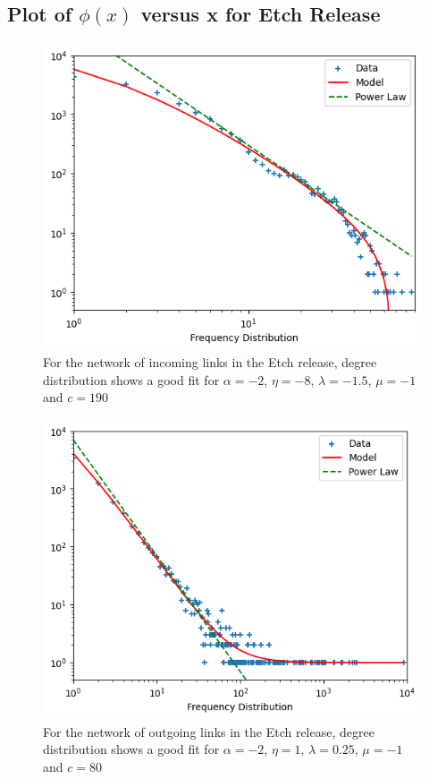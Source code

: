\documentclass[aps,twocolumn,10pt,reprint]{revtex4}
\begin{document}
\subsection{Plot of $\phi(x)$ versus x for Etch Release }
    
    \begin{figure}[H]
        \centering
        \includegraphics[width=1.0\linewidth, center]{images/lab5_q2_1.png}
        \vspace{-2mm}
        \caption{For the network of incoming links in the Etch release, degree distribution shows a good fit for $\alpha=-2$, $\eta=-8$, $\lambda=-1.5$, $\mu = -1$ and $c =190$ }
        \label{fig:q2}
    \end{figure}
    
    \begin{figure}[H]
        \centering
        \includegraphics[width=1.0\linewidth, center]{images/lab5_q2_2.png}
        \vspace{-2mm}
        \caption{For the network of outgoing links in the Etch release, degree distribution shows a good fit for $\alpha=-2$, $\eta=1$, $\lambda=0.25$, $\mu = -1$ and $c =80$}
        \label{fig:q2}
    \end{figure}
\end{document}
